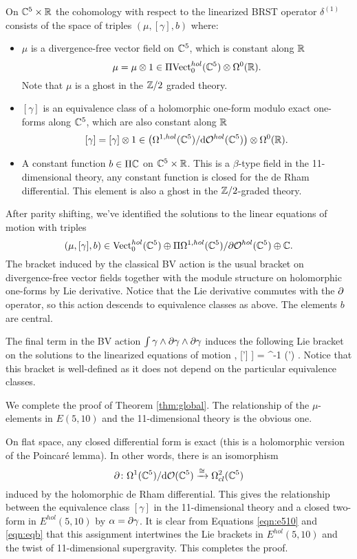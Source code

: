 On $\mathbb C^5 \times \mathbb R$ the cohomology with respect to the linearized BRST operator $\delta^{(1)}$ consists of the space of triples $(\mu, [\gamma], b)$ where:
\begin{itemize}
\item $\mu$ is a divergence-free vector field on $\mathbb C^5$, which is constant along $\mathbb R$
\[
\mu = \mu \otimes 1 \in \Pi {\rm Vect}^{hol}_0(\mathbb C^5) \otimes \Omega^0(\mathbb R) .
\]
Note that $\mu$ is a ghost in the $\mathbb Z/2$ graded theory. 
\item $[\gamma]$ is an equivalence class of a holomorphic one-form modulo exact one-forms along $\mathbb C^5$, which are also constant along $\mathbb R$
\[
[\gamma] = [\gamma] \otimes 1 \in \left(\Omega^{1,hol}(\mathbb C^5) / {\rm d} \mathcal O^{hol}(\mathbb C^5) \right) \otimes \Omega^0(\mathbb R) .
\]
\item A constant function $b \in \Pi \mathbb C$ on $\mathbb C^5 \times \mathbb R$.
This is a $\beta$-type field in the 11-dimensional theory, any constant function is closed for the de Rham differential. 
This element is also a ghost in the $\mathbb Z/2$-graded theory. 
\end{itemize}

\parsec[]

After parity shifting, we've identified the solutions to the linear equations of motion with triples
\[
(\mu, [\gamma], b) \in {\rm Vect}^{hol}_0(\mathbb C^5) \oplus \Pi \Omega^{1,hol}(\mathbb C^5) / \partial \mathcal O^{hol}(\mathbb C^5) \oplus \mathbb C .
\]
The bracket induced by the classical BV action is the usual bracket on divergence-free vector fields together with the module structure on holomorphic one-forms by Lie derivative.
Notice that the Lie derivative commutes with the $\partial$ operator, so this action descends to equivalence classes as above. 
The elements $b$ are central. 

The final term in the BV action $\int \gamma \wedge \partial \gamma \wedge \partial \gamma$ induces the following Lie bracket on the solutions to the linearized equations of motion
\beqn\label{eqn:eqb}
\big[[\gamma], [\gamma'] \big] = \Omega^{-1} \vee (\del \gamma \wedge \del \gamma') .
\eeqn
Notice that this bracket is well-defined as it does not depend on the particular equivalence classes. 

\parsec[]

We complete the proof of Theorem \ref{thm:global}. 
The relationship of the $\mu$-elements in $E(5,10)$ and the 11-dimensional theory is the obvious one.

On flat space, any closed differential form is exact (this is a holomorphic version of the Poincar\'e lemma). 
In other words, there is an isomorphism
\[
\partial \colon \Omega^1 (\mathbb C^5) / {\rm d} \mathcal O(\mathbb C^5) \xrightarrow{\cong} \Omega^{2}_{cl}(\mathbb C^5)
\]
induced by the holomorphic de Rham differential.
This gives the relationship between the equivalence class $[\gamma]$ in the 11-dimensional theory and a closed two-form in $E^{hol}(5,10)$ by $\alpha = \partial \gamma$. 
It is clear from Equations \eqref{eqn:e510} and \eqref{eqn:eqb} that this assignment intertwines the Lie brackets in $E^{hol}(5,10)$ and the twist of 11-dimensional supergravity. 
This completes the proof. 

